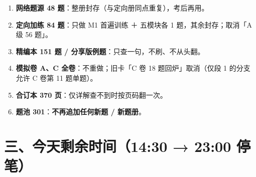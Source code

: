 \documentclass[11pt,a4paper]{ctexart}
\begin{document}
\begin{warnbox}
\begin{enumerate}[leftmargin=1.8em,itemsep=1pt]
\item \textbf{网络题源 48 题}：整册封存（与定向册同点重复），考后再用。
\item \textbf{定向加练 84 题}：只做 M1 首遍训练 ＋ 五模块各 1 题，其余封存；取消「A 级 56 题」。
\item \textbf{精编本 151 题 / 分享版例题}：只查一句，不刷、不从头翻。
\item \textbf{模拟卷 A、C 全卷}：不重做；旧卡「C 卷 18 题回炉」取消（仅段 1 的分支允许 C 卷第 11 题单题）。
\item \textbf{合订本 370 页}：仅详解查不到时按页码翻一次。
\item \textbf{题池 301}：\textbf{不再追加任何新题 / 新题册}。
\end{enumerate}
\end{warnbox}

\section{三、今天剩余时间（14:30 → 23:00 停笔）}

\end{document}
